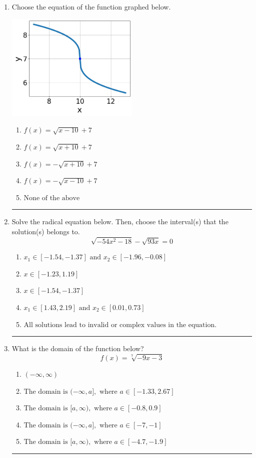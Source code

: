 \documentclass[14pt]{extbook}
\newcommand{\litem}[1]{\item#1\hspace*{-1cm}\rule{\textwidth}{0.4pt}}
\begin{document}
\begin{enumerate}
{\begin{enumerate}[label=\Alph*.]
\end{enumerate} }
\litem{
Choose the equation of the function graphed below.
\begin{center}
    \includegraphics[width=0.5\textwidth]{../Figures/radicalGraphToEquationCopyC.png}
\end{center}
\begin{enumerate}[label=\Alph*.]
\item \( f(x) = \sqrt{x - 10} + 7 \)
\item \( f(x) = \sqrt{x + 10} + 7 \)
\item \( f(x) = - \sqrt{x + 10} + 7 \)
\item \( f(x) = - \sqrt{x - 10} + 7 \)
\item \( \text{None of the above} \)

\end{enumerate} }
\litem{
Solve the radical equation below. Then, choose the interval(s) that the solution(s) belongs to.\[ \sqrt{-54 x^2 - 18} - \sqrt{93 x} = 0 \]\begin{enumerate}[label=\Alph*.]
\item \( x_1 \in [-1.54, -1.37] \text{ and } x_2 \in [-1.96,-0.08] \)
\item \( x \in [-1.23,1.19] \)
\item \( x \in [-1.54,-1.37] \)
\item \( x_1 \in [1.43, 2.19] \text{ and } x_2 \in [0.01,0.73] \)
\item \( \text{All solutions lead to invalid or complex values in the equation.} \)

\end{enumerate} }
\litem{
What is the domain of the function below?\[ f(x) = \sqrt[7]{-9 x - 3} \]\begin{enumerate}[label=\Alph*.]
\item \( (-\infty, \infty) \)
\item \( \text{The domain is } (-\infty, a], \text{   where } a \in [-1.33, 2.67] \)
\item \( \text{The domain is } [a, \infty), \text{   where } a \in [-0.8, 0.9] \)
\item \( \text{The domain is } (-\infty, a], \text{   where } a \in [-7, -1] \)
\item \( \text{The domain is } [a, \infty), \text{   where } a \in [-4.7, -1.9] \)


\end{enumerate}}
\end{enumerate}
\end{document}
